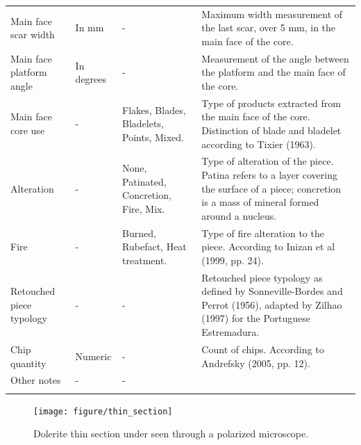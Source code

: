 \documentclass[12pt,twoside]{reedthesis}
\begin{document}
\begin{landscape}
\begin{longtable}[t]{>{\raggedright\arraybackslash}p{2cm}>{\raggedright\arraybackslash}p{3cm}>{\raggedright\arraybackslash}p{6cm}>{\raggedright\arraybackslash}p{9cm}}
Main face scar width & In mm & - & Maximum width measurement of the last scar, over 5 mm, in the main face of the core.\\
Main face platform angle & In degrees & - & Measurement of the angle between the platform and the main face of the core.\\
\addlinespace
Main face core use & - & Flakes, Blades, Bladelets, Points, Mixed. & Type of products extracted from the main face of the core. Distinction of blade and bladelet according to Tixier (1963).\\
Alteration & - & None, Patinated, Concretion, Fire, Mix. & Type of alteration of the piece. Patina refers to a layer covering the surface of a piece; concretion is a mass of mineral formed around a nucleus.\\
Fire & - & Burned, Rubefact, Heat treatment. & Type of fire alteration to the piece. According to Inizan et al (1999, pp. 24).\\
Retouched piece typology & - & - & Retouched piece typology as defined by Sonneville-Bordes and Perrot (1956), adapted by Zilhao (1997) for the Portuguese Estremadura.\\
Chip quantity & Numeric & - & Count of chips. According to Andrefsky (2005, pp. 12).\\
\addlinespace
Other notes & - & - & \\*
\end{longtable}
\end{landscape}
\endgroup{}
\begin{figure}

{\centering \texttt{[image: figure/thin\_section]} 

}

\caption{Dolerite thin section under seen through a polarized microscope.}\label{fig:doleritemicro}
\end{figure}
\end{document}
